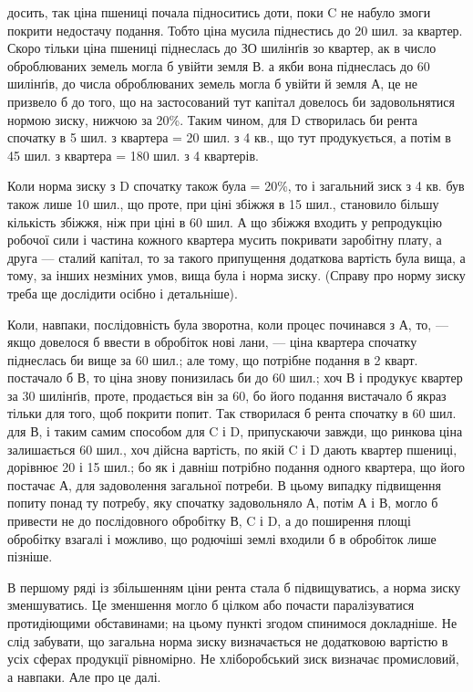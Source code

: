 \parcont{}  %
досить, так ціна пшениці почала підноситись доти, поки C не набуло змоги
покрити недостачу подання. Тобто ціна мусила піднестись до 20 шил. за
квартер. Скоро тільки ціна пшениці піднеслась до ЗО шилінґів зо квартер, ак
в число оброблюваних земель могла б увійти земля В. а якби вона піднеслась
до 60 шилінґів, до числа оброблюваних земель могла б увійти й земля А, це
не призвело б до того, що на застосований тут капітал довелось би задовольнятися
нормою зиску, нижчою за 20\%. Таким чином, для D створилась би
рента спочатку в 5 шил. з квартера = 20 шил. з 4 кв., що тут продукується,
а потім в 45 шил. з квартера = 180 шил. з 4 квартерів.

Коли норма зиску з D спочатку також була = 20\%, то і загальний зиск
з 4 кв. був також лише 10 шил., що проте, при ціні збіжжя в 15 шил., становило
більшу кількість збіжжя, ніж при ціні в 60 шил. А що збіжжя входить
у репродукцію робочої сили і частина кожного квартера мусить покривати заробітну
плату, а друга — сталий капітал, то за такого припущення додаткова
вартість була вища, а тому, за інших незміних умов, вища була і норма зиску.
(Справу про норму зиску треба ще дослідити осібно і детальніше).

Коли, навпаки, послідовність була зворотна, коли процес починався з А,
то, — якщо довелося б ввести в обробіток нові лани, — ціна квартера спочатку
піднеслась би вище за 60 шил.; але тому, що потрібне подання в 2 кварт. постачало
б В, то ціна знову понизилась би до 60 шил.; хоч В і продукує квартер
за 30 шилінґів, проте, продається він за 60, бо його подання вистачало б
якраз тільки для того, щоб покрити попит. Так створилася б рента спочатку в
60 шил. для В, і таким самим способом для C і D, припускаючи завжди, що
ринкова ціна залишається 60 шил., хоч дійсна вартість, по якій C і D дають
квартер пшениці, дорівнює 20 і 15 шил.; бо як і давніш потрібно подання одного
квартера, що його постачає А, для задоволення загальної потреби. В цьому випадку
підвищення попиту понад ту потребу, яку спочатку задовольняло А, потім
А і В, могло б привести не до послідовного обробітку В, C і D, а до поширення
площі обробітку взагалі і можливо, що родючіші землі входили б в обробіток
лише пізніше.

В першому ряді із збільшенням ціни рента стала б підвищуватись, а норма
зиску зменшуватись. Це зменшення могло б цілком або почасти паралізуватися
протидіющими обставинами; на цьому пункті згодом спинимося докладніше.
Не слід забувати, що загальна норма зиску визначається не додатковою вартістю
в усіх сферах продукції рівномірно. Не хліборобський зиск визначає промисловий,
а навпаки. Але про це далі.

